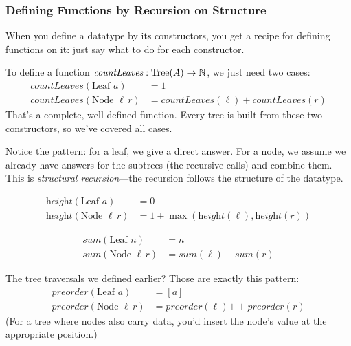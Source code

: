 \subsubsection*{Defining Functions by Recursion on Structure}

When you define a datatype by its constructors, you get a recipe for defining functions on it: just say what to do for each constructor.

\begin{example}
To define a function $\textit{countLeaves}: \text{Tree}(A) \to \mathbb{N}$, we just need two cases:
\begin{align*}
\textit{countLeaves}(\text{Leaf } a) &= 1 \\
\textit{countLeaves}(\text{Node } \ell\, r) &= \textit{countLeaves}(\ell) + \textit{countLeaves}(r)
\end{align*}
That's a complete, well-defined function. Every tree is built from these two constructors, so we've covered all cases.
\end{example}

Notice the pattern: for a leaf, we give a direct answer. For a node, we assume we already have answers for the subtrees (the recursive calls) and combine them. This is \emph{structural recursion}---the recursion follows the structure of the datatype.

\begin{example}
\begin{align*}
\textit{height}(\text{Leaf } a) &= 0 \\
\textit{height}(\text{Node } \ell\, r) &= 1 + \max(\textit{height}(\ell), \textit{height}(r))
\end{align*}
\end{example}

\begin{example}
\begin{align*}
\textit{sum}(\text{Leaf } n) &= n \\
\textit{sum}(\text{Node } \ell\, r) &= \textit{sum}(\ell) + \textit{sum}(r)
\end{align*}
\end{example}

The tree traversals we defined earlier? Those are exactly this pattern:
\begin{align*}
\textit{preorder}(\text{Leaf } a) &= [a] \\
\textit{preorder}(\text{Node } \ell\, r) &= \textit{preorder}(\ell) \mathbin{+\!\!+} \textit{preorder}(r)
\end{align*}
(For a tree where nodes also carry data, you'd insert the node's value at the appropriate position.)

